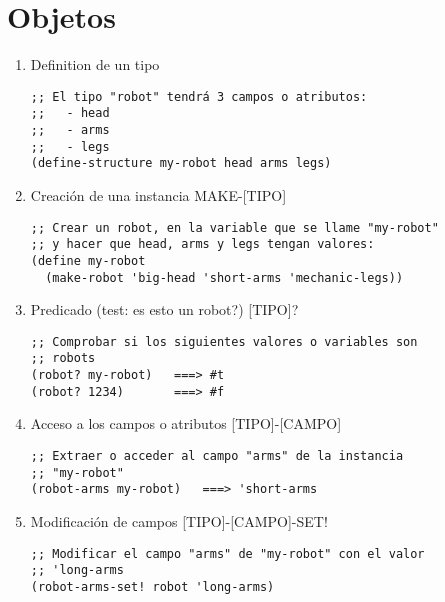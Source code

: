 \documentclass[a4paper,oneside]{article}
\begin{document}
\pagebreak
\section{Objetos}
\begin{enumerate}
  \item Definition de un tipo

    \begin{verbatim}
;; El tipo "robot" tendrá 3 campos o atributos:
;;   - head
;;   - arms
;;   - legs
(define-structure my-robot head arms legs)
    \end{verbatim}

  \item Creación de una instancia MAKE-[TIPO]

    \begin{verbatim}
;; Crear un robot, en la variable que se llame "my-robot"
;; y hacer que head, arms y legs tengan valores:
(define my-robot
  (make-robot 'big-head 'short-arms 'mechanic-legs))
    \end{verbatim}

  \item Predicado (test: es esto un robot?) [TIPO]?

    \begin{verbatim}
;; Comprobar si los siguientes valores o variables son
;; robots
(robot? my-robot)   ===> #t
(robot? 1234)       ===> #f
    \end{verbatim}

  \item Acceso a los campos o atributos [TIPO]-[CAMPO]

    \begin{verbatim}
;; Extraer o acceder al campo "arms" de la instancia
;; "my-robot"
(robot-arms my-robot)   ===> 'short-arms
    \end{verbatim}

  \item Modificación de campos [TIPO]-[CAMPO]-SET!

    \begin{verbatim}
;; Modificar el campo "arms" de "my-robot" con el valor
;; 'long-arms
(robot-arms-set! robot 'long-arms)
    \end{verbatim}

\end{enumerate}
\end{document}
